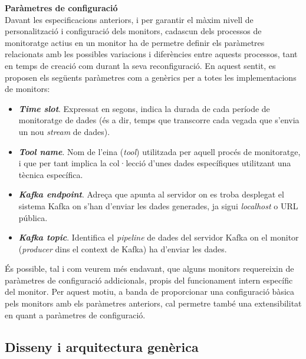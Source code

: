 \noindent \textbf{\large Paràmetres de configuració}\\

\noindent Davant les especificacions anteriors, i per garantir el màxim nivell de personalització i configuració dels monitors, cadascun dels processos de monitoratge actius en un monitor ha de permetre definir els paràmetres relacionats amb les possibles variacions i diferències entre aquests processos, tant en temps de creació com durant la seva reconfiguració. En aquest sentit, es proposen els següents paràmetres com a genèrics per a totes les implementacions de monitors:

\begin{itemize}
\item \textbf{\textit{Time slot}}. Expressat en segons, indica la durada de cada període de monitoratge de dades (és a dir, temps que transcorre cada vegada que s'envia un nou \textit{stream} de dades).
\item \textbf{\textit{Tool name}}. Nom de l'eina (\textit{tool}) utilitzada per aquell procés de monitoratge, i que per tant implica la col·lecció d'unes dades específiques utilitzant una tècnica específica.
\item \textbf{\textit{Kafka endpoint}}. Adreça que apunta al servidor on es troba desplegat el sistema Kafka on s'han d'enviar les dades generades, ja sigui \textit{localhost} o URL pública.
\item \textbf{\textit{Kafka topic}}. Identifica el \textit{pipeline} de dades del servidor Kafka on el monitor (\textit{producer} dins el context de Kafka) ha d'enviar les dades.
\end{itemize}

És possible, tal i com veurem més endavant, que alguns monitors requereixin de paràmetres de configuració addicionals, propis del funcionament intern específic del monitor. Per aquest motiu, a banda de proporcionar una configuració bàsica pels monitors amb els paràmetres anteriors, cal permetre també una extensibilitat en quant a paràmetres de configuració.

\subsection{Disseny i arquitectura genèrica}

